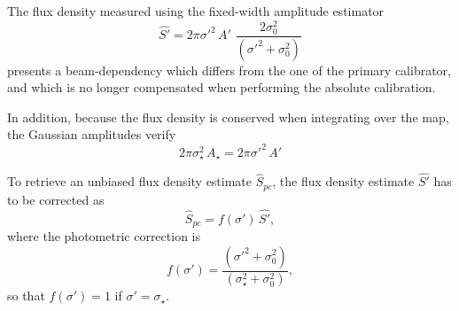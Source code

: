 The flux density measured using the fixed-width amplitude estimator 
\begin{equation}
  \hat{S'}  =2\pi \sigma'^2 \, A' \, \,  \frac{2 \sigma_0^2}{(\sigma'^2 + \sigma_0^2)}
\end{equation}
presents a beam-dependency which differs from the one of the primary
calibrator, and which is no longer compensated when performing the
absolute calibration.

{\lp In addition, because the flux density is conserved when integrating over the map,
the Gaussian amplitudes verify
\begin{equation}
2\pi \sigma_{\star}^2 \, A_{\star} = 2\pi \sigma'^2 \, A'
\label{eq:gaussian_amplitude}
\end{equation}}

To retrieve an unbiased flux density estimate $\hat{S}_{pc}$, the
flux density estimate $\hat{S'}$ has to be corrected as
\begin{equation}
  \hat{S}_{pc} = f(\sigma') \, \hat{S'},
\end{equation} 
where the photometric correction is 
\begin{equation}
  f(\sigma') = \frac{(\sigma'^2 + \sigma_0^2)}{(\sigma_\star^2+\sigma_0^2)}, 
\end{equation} 
so that $f(\sigma') = 1$ if $\sigma'=\sigma_\star$.

